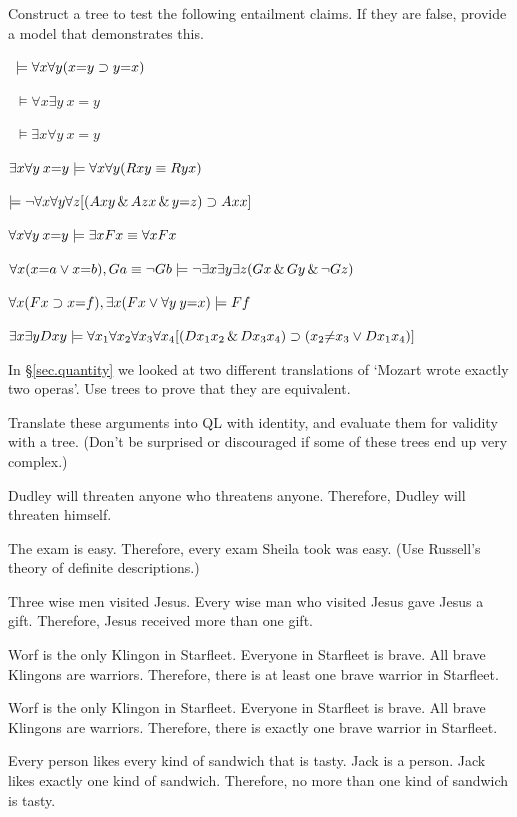 \solutions
\problempart Construct a tree to test the following entailment claims. If they are false, provide a model that demonstrates this.
\label{pr.IdentityTrees}
\begin{earg}
\item\  $\models \forall x \forall y (x{=}y \supset y{=}x)$
\item\ $\models \forall x \exists y \: x{=}y$
\item\  $\models \exists x \forall y \: x{=}y$
\item   $\exists x \forall y \: x{=}y \models \forall x \forall y (Rxy \equiv Ryx)$
\item   $\models \neg \forall x \forall y \forall z [(Axy \,\&\, Azx \,\&\, y{=}z) \supset Axx] $
\item  $\forall x \forall y \: x{=}y \models \exists x Fx \equiv \forall x Fx$
\item $\forall x (x{=}a \vee x{=}b), Ga \equiv \neg Gb \models \neg \exists x \exists y \exists z (Gx \,\&\, Gy \,\&\, \neg Gz)$
\item $\forall x (Fx \supset x{=}f), \exists x (Fx \vee \forall y \: y{=}x) \models Ff$
\item $\exists x \exists y Dxy \models \forall x_{1} \forall x_{2} \forall x_{3} \forall x_{4} [(Dx_{1}x_{2} \,\&\, Dx_{3}x_{4}) \supset (x_{2}{\neq}x_{3} \vee Dx_{1}x_{4})]$
\end{earg}

\problempart In \S \ref{sec.quantity} we looked at two different translations of `Mozart wrote exactly two operas'. Use trees to prove that they are equivalent.

\problempart Translate these arguments into QL with identity, and evaluate them for validity with a tree. (Don't be surprised or discouraged if some of these trees end up very complex.)
\label{pr.IdentityArguments}
\begin{earg}
\item Dudley will threaten anyone who threatens anyone. Therefore, Dudley will threaten himself.
\item The exam is easy. Therefore, every exam Sheila took was easy. (Use Russell's theory of definite descriptions.)
\item Three wise men visited Jesus. Every wise man who visited Jesus gave Jesus a gift. Therefore, Jesus received more than one gift.
\item Worf is the only Klingon in Starfleet. Everyone in Starfleet is brave. All brave Klingons are warriors. Therefore, there is at least one brave warrior in Starfleet.
\item Worf is the only Klingon in Starfleet. Everyone in Starfleet is brave. All brave Klingons are warriors. Therefore, there is exactly one brave warrior in Starfleet.
\item Every person likes every kind of sandwich that is tasty. Jack is a person. Jack likes exactly one kind of sandwich. Therefore, no more than one kind of sandwich is tasty.
\end{earg}



